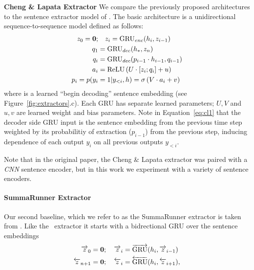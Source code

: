 {\textbf{Cheng \& Lapata Extractor} 
We compare the previously proposed architectures to the sentence extractor
model of \cite{cheng2016neural}. 
The basic architecture is a unidirectional
sequence-to-sequence
model defined as follows:
\begin{align}
    \encExtHidden_0 = \textbf{0};&\quad   \encExtHidden_i = \gru_{enc}(\sentvec_i, \encExtHidden_{i-1}) \\
    \decExtHidden_1 &= \gru_{dec}(\sentEmb[*], \encExtHidden_{\docSize}) \\
    \decExtHidden_i &= \gru_{dec}(p_{i-1} \cdot \sentvec_{i-1}, \decExtHidden_{i-1}) \label{eq:cl1} \\
   \logits_i &= \relu\left(U \cdot [\encExtHidden_i; \decExtHidden_i] + u \right)\\
    p_i = p(\slabel_i&=1|\slabel_{<i}, \sentvec) = \sigma\left(V\cdot \logits_i + v  \right) 
\end{align}
where \sentEmb[*] is a learned ``begin decoding'' sentence embedding
(see Figure~\ref{fig:extractors}.c).
Each GRU has separate learned 
parameters; $U, V$ and $u, v$ are learned weight and bias parameters.
Note in Equation~\ref{eq:cl1} that 
the decoder side GRU input is the sentence embedding from the previous time
step weighted by its probabilitiy of extraction ($p_{i-1}$) from the 
previous step, inducing dependence of each output $y_i$ on all previous 
outputs $y_{<i}$.

Note that in the original paper, the Cheng \& Lapata extractor was paired 
with
a \textit{CNN} sentence encoder, but in this work we experiment with a variety
of sentence encoders.


\paragraph{SummaRunner Extractor}{
Our second baseline, which we refer to as the SummaRunner extractor is taken 
from 
\cite{nallapati2017summarunner}.
Like the
\modelOne~extractor it starts with a bidrectional GRU over the sentence 
embeddings 
\begin{align}
    \overrightarrow{z}_0 = \textbf{0}&;\quad \overrightarrow{z}_i = \overrightarrow{\operatorname{GRU}}(h_i, \overrightarrow{z}_{i-1}) \\
    \overleftarrow{z}_{n + 1} = \textbf{0}&;\quad \overleftarrow{z}_i = \overleftarrow{\operatorname{GRU}}(h_i, \overleftarrow{z}_{i+1}),
\end{align}
}

}
